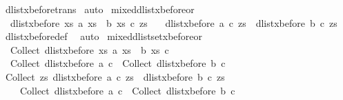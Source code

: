 \begin{isabellebody}
%
\isatagproof
{}\isamarkupfalse%
\ dlist{\isacharunderscore}xbefore{\isacharunderscore}trans\isanewline
{}\isamarkupfalse%
\ auto%
\endisatagproof
{\isafoldproof}%
%
\isadelimproof
%
\endisadelimproof
%
\isamarkuptrue%
\isamarkupfalse%
\ mixed{\isacharunderscore}dlist{\isacharunderscore}xbefore{\isacharunderscore}or{}{\isacharcolon}\ {\isachardoublequoteopen}\ \ \isanewline
\ \ dlist{\isacharunderscore}xbefore\ {\isacharparenleft}{\isasymlambda}xs{\isachardot}\ a\ xs\ {\isasymor}\ b\ xs{\isacharparenright}\ c\ zs\ {\isacharequal}\isanewline
\ \ {\isacharparenleft}{\isacharparenleft}dlist{\isacharunderscore}xbefore\ a\ c\ zs{\isacharparenright}\ {\isasymor}\ {\isacharparenleft}dlist{\isacharunderscore}xbefore\ b\ c\ zs{\isacharparenright}{\isacharparenright}{\isachardoublequoteclose}\isanewline
%
\isadelimproof
%
\endisadelimproof
%
\isatagproof
{}\isamarkupfalse%
\ dlist{\isacharunderscore}xbefore{\isacharunderscore}def\ \isamarkupfalse%
\ auto%
\endisatagproof
{\isafoldproof}%
%
\isadelimproof
\isanewline
%
\endisadelimproof
\isanewline
{}\isamarkupfalse%
\ mixed{\isacharunderscore}dlistset{\isacharunderscore}xbefore{\isacharunderscore}or{}{\isacharcolon}\ {\isachardoublequoteopen}\isanewline
\ \ Collect\ {\isacharparenleft}dlist{\isacharunderscore}xbefore\ {\isacharparenleft}{\isasymlambda}xs{\isachardot}\ a\ xs\ {\isasymor}\ b\ xs{\isacharparenright}\ c{\isacharparenright}\ {\isacharequal}\ \isanewline
\ \ Collect\ {\isacharparenleft}dlist{\isacharunderscore}xbefore\ a\ c{\isacharparenright}\ {\isasymunion}\ Collect\ {\isacharparenleft}dlist{\isacharunderscore}xbefore\ b\ c{\isacharparenright}{\isachardoublequoteclose}\isanewline
%
\isadelimproof
%
\endisadelimproof
%
\isatagproof
{}\isamarkupfalse%
{\isacharminus}\isanewline
\ \ \isamarkupfalse%
\ {\isachardoublequoteopen}Collect\ {\isacharparenleft}{\isasymlambda}zs{\isachardot}\ {\isacharparenleft}dlist{\isacharunderscore}xbefore\ a\ c\ zs{\isacharparenright}\ {\isasymor}\ {\isacharparenleft}dlist{\isacharunderscore}xbefore\ b\ c\ zs{\isacharparenright}{\isacharparenright}\ {\isacharequal}\isanewline
\ \ \ \ {\isacharparenleft}Collect\ {\isacharparenleft}dlist{\isacharunderscore}xbefore\ a\ c{\isacharparenright}\ {\isasymunion}\ Collect\ {\isacharparenleft}dlist{\isacharunderscore}xbefore\ b\ c{\isacharparenright}{\isacharparenright}{\isachardoublequoteclose}\isanewline

\end{isabellebody}
